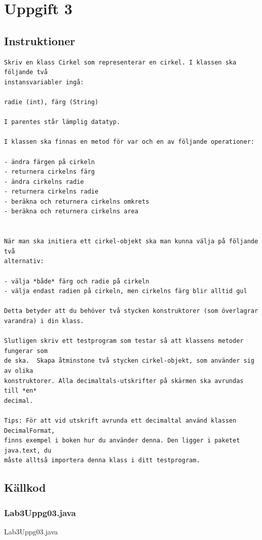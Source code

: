 \section{Uppgift 3}\label{sec:uppg03}

\subsection{Instruktioner}
\begin{Verbatim}[fontsize=\small]
Skriv en klass Cirkel som representerar en cirkel. I klassen ska följande två
instansvariabler ingå:

radie (int), färg (String)

I parentes står lämplig datatyp.

I klassen ska finnas en metod för var och en av följande operationer:

- ändra färgen på cirkeln
- returnera cirkelns färg
- ändra cirkelns radie
- returnera cirkelns radie
- beräkna och returnera cirkelns omkrets
- beräkna och returnera cirkelns area


När man ska initiera ett cirkel-objekt ska man kunna välja på följande två
alternativ:

- välja *både* färg och radie på cirkeln
- välja endast radien på cirkeln, men cirkelns färg blir alltid gul

Detta betyder att du behöver två stycken konstruktorer (som överlagrar
varandra) i din klass.

Slutligen skriv ett testprogram som testar så att klassens metoder fungerar som
de ska.  Skapa åtminstone två stycken cirkel-objekt, som använder sig av olika
konstruktorer. Alla decimaltals-utskrifter på skärmen ska avrundas till *en*
decimal.

Tips: För att vid utskrift avrunda ett decimaltal använd klassen DecimalFormat,
finns exempel i boken hur du använder denna. Den ligger i paketet java.text, du
måste alltså importera denna klass i ditt testprogram.
\end{Verbatim}


\subsection{Källkod}
\subsubsection{Lab3Uppg03.java}
\caption{Lab3Uppg03.java}
\label{src:uppg03}


